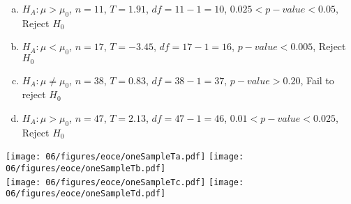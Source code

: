 {
\begin{enumerate}[(a)]
\setlength{\itemsep}{0mm}
\item $H_A: \mu > \mu_0 $, $n = 11$, $T= 1.91$, $df = 11 - 1 = 10$, $0.025 < p-value < 0.05$, Reject $H_0$
\item $H_A: \mu < \mu_0 $, $n = 17$, $T = -3.45$, $df = 17 - 1 = 16$, $p-value < 0.005$, Reject $H_0$
\item $H_A: \mu \ne \mu_0 $, $n = 38$, $T = 0.83$, $df = 38 - 1 = 37$, $p-value > 0.20$,  Fail to reject $H_0$
\item $H_A: \mu > \mu_0 $, $n = 47$, $T = 2.13$, $df = 47 - 1 = 46$, $0.01 < p-value < 0.025$, Reject $H_0$ \\
\end{enumerate}

\begin{center}
\texttt{[image: 06/figures/eoce/oneSampleTa.pdf]}
\texttt{[image: 06/figures/eoce/oneSampleTb.pdf]} \\
\texttt{[image: 06/figures/eoce/oneSampleTc.pdf]}
\texttt{[image: 06/figures/eoce/oneSampleTd.pdf]}
\end{center}
}

%

